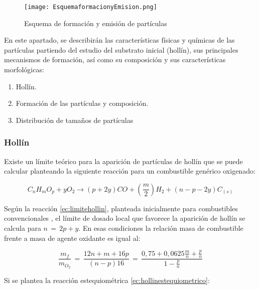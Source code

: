 \begin{figure}[ht]
\centering
	\texttt{[image: EsquemaformacionyEmision.png]}	 
	\caption{Esquema de formación y emisión de partículas} \label{fig:procesosformacionyemision}
\end{figure} 

\par En este apartado, se describirán las características físicas y químicas de las partículas partiendo del estudio del substrato inicial (hollín), sus principales mecanismos de formación, así como su composición y sus características morfológicas:

\begin{enumerate}
\item Hollín.
\item Formación de las partículas y composición.
\item Distribución de tamaños de partículas
\end{enumerate}

\subsubsection{Hollín}

\par Existe un límite teórico para la aparición de partículas de hollín que se puede calcular planteando la siguiente reacción para un combustible genérico oxigenado:

\begin{equation}
\label{ec:limitehollin}
C_nH_mO_p + yO_2 \rightarrow (p + 2y)CO + \left( \frac{m}{2} \right) H_2 + (n-p-2y)C_{(s)}
\end{equation}

Según la reacción \ref{ec:limitehollin}, planteada inicialmente para combustibles convencionales \cite{haynessetal:1981}, el límite de  dosado local que favorece la aparición de hollín se calcula para $n\,=\,2p+y$. En esas condiciones la relación masa de combustible frente a masa de agente oxidante es igual al:

\begin{equation}
\label{ec:relacionmasacombagoxidantedosadofavorecehollin}
\frac{m_f}{m_{O_2}}\,=\,\dfrac{12n+m+16p}{(n-p)16}\,=\,\dfrac{0,75+0,0625\frac{m}{n}+\frac{p}{n}}{1-\frac{p}{n}}
\end{equation}

\par Si se plantea la reacción estequiométrica \ref{ec:hollinestequiometrico}:

